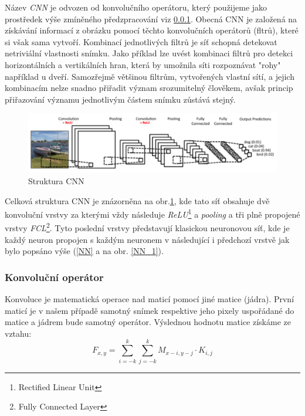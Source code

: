 \documentclass[12pt]{article}
\begin{document}
Název \textit{CNN} je odvozen od konvolučního operátoru, který použijeme jako prostředek výše zmíněného předzpracování viz \ref{conv_op}. Obecná CNN je založená na získávání informací z obrázku pomocí těchto konvolučních operátorů (fltrů), které si však sama vytvoří. Kombinací jednotlivých filtrů je síť schopná detekovat netriviální vlastnosti snímku. Jako příklad lze uvést kombinaci filtrů pro detekci horizontálních a vertikálních hran, která by umožnila síti rozpoznávat "rohy" například u dveří. Samozřejmě většinou filtrům, vytvořených vlastní sítí, a jejich kombinacím nelze snadno přiřadit význam srozumitelný člověkem, avšak princip přiřazování významu jednotlivým částem snímku zůstává stejný.

\begin{figure}[h]
\centerline{
\includegraphics[width=15cm]{CNN_struct.png}
}
\caption[]{Struktura CNN\footnotemark}
\label{im_CNN_structure}
\end{figure}

Celková struktura CNN je znázorněna na obr.\ref{im_CNN_structure}, kde tato síť obsahuje dvě konvoluční vrstvy za kterými vždy následuje \textit{ReLU}\footnote{Rectified Linear Unit
} a \textit{pooling} a tři plně propojené vrstvy \textit{FCL}\footnote{
Fully Connected Layer
}. Tyto poslední vrstvy představují klasickou neuronovou síť, kde je každý neuron propojen s každým neuronem v následující i předchozí vrstvě jak bylo popsáno výše (\ref{NN} a na obr. \ref{NN_1}). 

\subsubsection{Konvoluční operátor}
\label{conv_op}
Konvoluce je matematická operace nad maticí pomocí jiné matice (jádra). První maticí je v našem případě samotný snímek respektive jeho pixely uspořádané do matice a jádrem bude samotný operátor. Výslednou hodnotu matice získáme ze vztahu:
\begin{equation}
{ F }_{ x,y }=\sum _{ i=-k }^{ k }{ \sum _{ j=-k }^{ k }{ { M }_{ x-i, y-j }\cdot { K }_{ i,j } }  } 
\end{equation}
\end{document}
